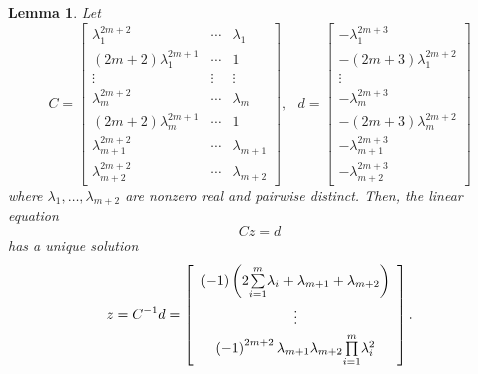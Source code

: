 \documentclass[journal,a4paper,12pt,onecolumn]{IEEEtran}
\newtheorem{lemma}[theorem]{Lemma}
\begin{document}
\begin{lemma}
Let\begin{equation*}
C=\left[
\begin{array}{ccc}
\lambda _{1}^{2m+2} & \cdots & \lambda _{1} \\
\left( 2m+2\right) \lambda _{1}^{2m+1} & \cdots & 1 \\
\vdots & \vdots & \vdots \\
\lambda _{m}^{2m+2} & \cdots & \lambda _{m} \\
\left( 2m+2\right) \lambda _{m}^{2m+1} & \cdots & 1 \\
\lambda _{m+1}^{2m+2} & \cdots & \lambda _{m+1} \\
\lambda _{m+2}^{2m+2} & \cdots & \lambda _{m+2}\end{array}\right] ,\text{ }d=\left[
\begin{array}{c}
-\lambda _{1}^{2m+3} \\
-\left( 2m+3\right) \lambda _{1}^{2m+2} \\
\vdots \\
-\lambda _{m}^{2m+3} \\
-\left( 2m+3\right) \lambda _{m}^{2m+2} \\
-\lambda _{m+1}^{2m+3} \\
-\lambda _{m+2}^{2m+3}\end{array}\right]
\end{equation*}where $\lambda _{1},\ldots ,\lambda _{m+2}$ are nonzero real and pairwise
distinct. Then, the linear equation\begin{equation}
Cz=d
\end{equation}has a unique solution\begin{equation}
z=C^{-1}d=\left[
\begin{array}{c}
\left( -1\right) \left( 2\overset{m}{\underset{i=1}{\sum }}\lambda
_{i}+\lambda _{m+1}+\lambda _{m+2}\right) \\
\overset{}{\underset{}{\vdots }} \\
\left( -1\right) ^{2m+2}\lambda _{m+1}\lambda _{m+2}\overset{m}{\underset{i=1}{\prod }}\lambda _{i}^{2}\end{array}\right] .  \notag
\end{equation}
\end{lemma}
\end{document}
